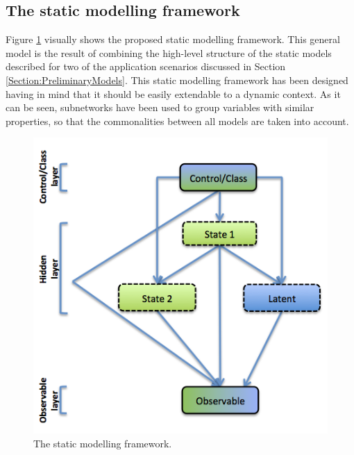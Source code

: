 
\subsection{The static modelling framework}\label{StaticFramework}

Figure \ref{Figure:StaticModellingFramework} visually shows the proposed static modelling framework. This general model
is the result of combining the high-level structure of the static models described for two of the application scenarios discussed in Section \ref{Section:PreliminaryModels}. This static modelling framework has been designed having in mind that it should be easily extendable to a dynamic context. As it can be seen, subnetworks have been used to group variables with similar properties, so that the commonalities between all models are taken into account. 

\begin{figure}[ht!]
\begin{center}
\includegraphics[scale=0.4]{./figures/StaticModellingFramework}
\caption{\label{Figure:StaticModellingFramework} The static modelling framework.}
\end{center}
\end{figure}

